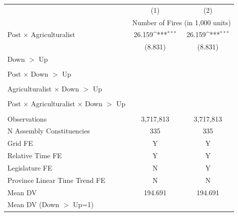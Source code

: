 {
\def\sym#1{\ifmmode^{#1}\else\(^{#1}\)\fi}
\begin{tabular}{l*{2}{c}}
\hline
            &\multicolumn{1}{c}{(1)}         &\multicolumn{1}{c}{(2)}         \\
            & \multicolumn{2}{c}{Number of Fires (in 1,000 units)} \\ \hline

Post $\times$ Agriculturalist&      26.159\sym{***}&      26.159\sym{***}\\
            &     (8.831)         &     (8.831)         \\
Down $>$ Up &                     &                     \\
            &                     &                     \\
Post $\times$ Down $>$ Up&                     &                     \\
            &                     &                     \\
Agriculturalist $\times$ Down $>$ Up&                     &                     \\
            &                     &                     \\
Post $\times$ Agriculturalist $\times$ Down $>$ Up&                     &                     \\
            &                     &                     \\
\hline
Observations&   3,717,813         &   3,717,813         \\
N Assembly Constituencies&         335         &         335         \\
Grid FE     &           Y         &           Y         \\
Relative Time FE&           Y         &           Y         \\
Legislature FE&           N         &           Y         \\
Province Linear Time Trend FE&           N         &           N         \\
Mean DV     &     194.691         &     194.691         \\
Mean DV (Down $>$ Up=1)&                     &                     \\
\hline
\end{tabular}
}
